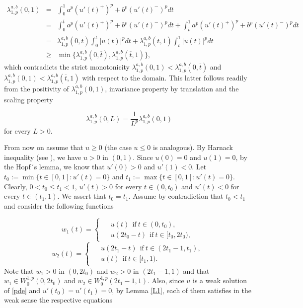 \documentclass[a4paper,11pt]{article}
\begin{document}
{\begin{eqnarray*}
\lambda_{1,p}^{a,b}(0,1) &=& \int_{0}^{1} a^p \left( u'(t)^+ \right)^p + b^p \left( u'(t)^- \right)^p dt\\
&=& \int_{0}^{\overline{t}} a^p \left( u'(t)^+ \right)^p + b^p \left( u'(t)^- \right)^p dt + \int_{\overline{t}}^{1} a^p \left( u'(t)^+ \right)^p + b^p \left( u'(t)^- \right)^p dt\\
&=& \lambda_{1,p}^{a,b}(0,\overline{t}) \int_{0}^{\overline{t}} |u(t)|^p dt + \lambda_{1,p}^{a,b}(\overline{t}, 1) \int_{\overline{t}}^{1} |u(t)|^p dt \\
&\geq& \min\{\lambda_{1,p}^{a,b}(0,\overline{t}), \lambda_{1,p}^{a,b}(\overline{t}, 1)\},
\end{eqnarray*}
which contradicts the strict monotonicity $\lambda_{1,p}^{a,b}(0,1) < \lambda_{1,p}^{a,b}(0,\overline{t})$ and $\lambda_{1,p}^{a,b}(0,1) < \lambda_{1,p}^{a,b}(\overline{t}, 1)$ with respect to the domain. This latter follows readily from the positivity of $\lambda_{1,p}^{a,b}(0,1)$, invariance property by translation and the scaling property

\[
\lambda_{1,p}^{a,b}(0, L) = \frac{1}{L^p} \lambda_{1,p}^{a,b}(0,1)
\]
for every $L > 0$.

From now on assume that $u \geq 0$ (the case $u \leq 0$ is analogous). By Harnack inequality (see \cite{Tr}), we have $u > 0$ in $(0,1)$. Since $u(0) = 0$ and $u(1) = 0$, by the Hopf´s lemma, we know that $u'(0) >  0$ and $u'(1) < 0$. Let $t_0 := \min\{t \in [0,1]: u'(t) = 0\}$ and $t_1 := \max\{t \in [0,1]: u'(t) = 0\}$. Clearly, $0 < t_0 \leq t_1 < 1$, $u'(t) > 0$ for every $t \in (0,t_0)$ and $u'(t) < 0$ for every $t \in (t_1, 1)$. We assert that $t_0 = t_1$. Assume by contradiction that $t_0 < t_1$ and consider the following functions

\begin{equation*}
w_1(t) =
\begin{cases}
\begin{aligned}
     & u(t)\ \ \text{if} \ t \in (0,t_{0}), \\
     & u(2t_{0}-t)\ \ \text{if} \ t \in [t_{0},2t_{0}),
\end{aligned}
\end{cases}
\end{equation*}
\begin{equation*}
w_2(t) =
\begin{cases}
\begin{aligned}
     & u(2t_{1}-t)\ \ \text{if} \ t \in (2t_{1}-1,t_{1}), \\
     & u(t)\ \ \text{if} \ t \in [t_{1},1).
\end{aligned}
\end{cases}
\end{equation*}
Note that $w_1 > 0$ in $(0,2 t_0)$ and $w_2 > 0$ in $(2 t_1 - 1,1)$ and that $w_1 \in W^{1,p}_{0}(0,2t_{0})$ and $w_2 \in W^{1,p}_{0}(2t_{1}-1,1)$. Also, since $u$ is a weak solution of \eqref{pde} and $u'(t_0) = u'(t_1) = 0$, by Lemma \ref{L1}, each of them satisfies in the weak sense the respective equations

}
\end{document}
